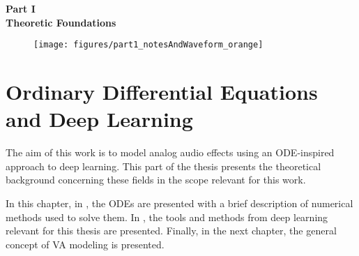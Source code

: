 \cleardoublepage
\thispagestyle{empty}
\begin{center}
\vspace*{3cm}
{\huge \bf Part I}\\ \vspace*{1cm}
{\Huge \bf Theoretic Foundations}\\\vspace*{0.2cm}
\begin{figure}[ht]
\centering
\texttt{[image: figures/part1\_notesAndWaveform\_orange]}
\end{figure}
\end{center}
\label{par:part1}
\newpage
\quad
\thispagestyle{empty}
\newpage



\chapter{Ordinary Differential Equations and Deep Learning}
\label{chapter:odes_and_dl}

The aim of this work is to model analog audio effects using an \ac{ODE}-inspired approach to deep learning. This part of the thesis presents the theoretical background concerning these fields in the scope relevant for this work. 

In this chapter, in , the \acp{ODE} are presented with a brief description of numerical methods used to solve them. In , the tools and methods from deep learning relevant for this thesis are presented. Finally, in the next chapter, the general concept of \ac{VA} modeling is presented.



